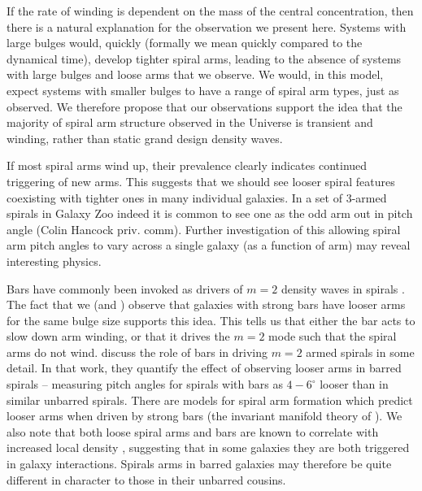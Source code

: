 \documentclass[usenatbib]{mn2e}
\begin{document}
If the rate of winding is dependent on the mass of the central concentration, then there is a natural explanation for the observation we present here. Systems with large bulges would, quickly (formally we mean quickly compared to the dynamical time), develop tighter spiral arms, leading to the absence of systems with large bulges and loose arms that we observe. We would, in this model, expect systems with smaller bulges to have a range of spiral arm types, just as observed. We therefore propose that our observations support the idea that the majority of spiral arm structure observed in the Universe is transient and winding, rather than static grand design density waves. 

If most spiral arms wind up, their prevalence clearly indicates continued triggering of new arms. This suggests that we should see
looser spiral features coexisting with tighter ones in many individual galaxies. In a set of 3-armed spirals in Galaxy Zoo indeed it is 
common to see one as the odd arm out in pitch angle (Colin Hancock priv. comm). Further investigation of this allowing spiral arm pitch angles to vary across a single galaxy (as a function of arm) may reveal interesting physics. 

 Bars have commonly been invoked as drivers of $m=2$ density waves in spirals \citep[e.g.][]{DobbsBaba2014,Hart2017b}. The fact that we (and \citealt{Hart2017b}) observe that galaxies with strong bars have looser arms for the same bulge size supports this idea. This tells us that either the bar acts to slow down arm winding, or that it drives the $m=2$ mode such that the spiral arms do not wind. \citet{Hart2017b} discuss the role of bars in driving $m=2$ armed spirals in some detail. In that work, they quantify the effect of observing looser arms in barred spirals -- measuring pitch angles for spirals with bars as $4-6^\circ$ looser than in similar unbarred spirals. There are models for spiral arm formation which predict looser arms when driven by strong bars (the invariant manifold theory of \citealt{Romero-Gomez2007}). We also note that both loose spiral arms and bars are known to correlate with increased local density \citep{Casteels2013}, suggesting that in some galaxies they are both triggered in galaxy interactions. Spirals arms in barred galaxies may therefore be quite different in character to those in their unbarred cousins. 
 
\end{document}
